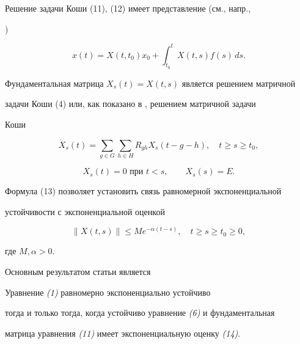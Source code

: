 Решение задачи Коши (11), (12) имеет представление (см., напр.,


\cite{Mak})


%


\begin{equation}


x(t)=X(t,t_0)x_0+\int_{t_0}^tX(t,s)f(s)\,ds.


\end{equation}


%


Фундаментальная матрица $X_s(t)=X(t,s)$ является решением матричной


задачи Коши (4) или, как показано в \cite{Mak}, решением матричной задачи


Коши


$$


\Dot X_s(t)=\sum_{g\in G}\sum_{h\in H}R_{gh}X_s(t-g-h),\quad t\ge s\ge t_0,


$$


$$


X_s(t)=0\text{ при }t<s,\qquad X_s(s)=E.


$$





Формула (13) позволяет установить связь равномерной экспоненциальной


устойчивости с экспоненциальной оценкой


%


\begin{equation}


\|X(t,s)\|\le Me^{-\alpha(t-s)},\quad t\ge s\ge t_0\ge0,


\end{equation}


%


где $M,\alpha>0$.





Основным результатом статьи является





\begin{thmnonum} Уравнение {\em (1)} равномерно экспоненциально устойчиво


тогда и только тогда, когда устойчиво уравнение {\em (6)} и фундаментальная


матрица уравнения {\em (11)} имеет экспоненциальную оценку {\em (14)}.


\end{thmnonum}





